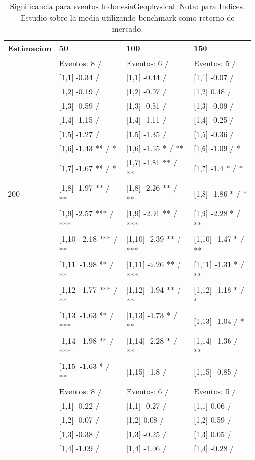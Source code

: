 \begin{table}

\caption{Significancia para eventos IndonesiaGeophysical. Nota: para Indices. Estudio sobre la media utilizando benchmark como retorno de mercado.}
\centering
\begin{tabular}[t]{llll}
\toprule
Estimacion & 50 & 100 & 150\\
\midrule
 & Eventos:  8 / & Eventos:  6 / & Eventos:  5 /\\
 & {}[1,1] -0.34  / & {}[1,1] -0.44  / & {}[1,1] -0.07  /\\
 & {}[1,2] -0.19  / & {}[1,2] -0.07  / & {}[1,2] 0.48  /\\
 & {}[1,3] -0.59  / & {}[1,3] -0.51  / & {}[1,3] -0.09  /\\
 & {}[1,4] -1.15  / & {}[1,4] -1.11  / & {}[1,4] -0.25  /\\
\addlinespace
 & {}[1,5] -1.27  / & {}[1,5] -1.35  / & {}[1,5] -0.36  /\\
 & {}[1,6] -1.43 ** / * & {}[1,6] -1.65 * / ** & {}[1,6] -1.09  / *\\
 & {}[1,7] -1.67 ** / * & {}[1,7] -1.81 ** / ** & {}[1,7] -1.4 * / *\\
200 & {}[1,8] -1.97 ** / ** & {}[1,8] -2.26 ** / ** & {}[1,8] -1.86 * / *\\
 & {}[1,9] -2.57 *** / *** & {}[1,9] -2.91 ** / *** & {}[1,9] -2.28 * / **\\
\addlinespace
 & {}[1,10] -2.18 *** / ** & {}[1,10] -2.39 ** / *** & {}[1,10] -1.47 * / **\\
 & {}[1,11] -1.98 ** / ** & {}[1,11] -2.26 ** / *** & {}[1,11] -1.31 * / **\\
 & {}[1,12] -1.77 *** / ** & {}[1,12] -1.94 ** / ** & {}[1,12] -1.18 * / *\\
 & {}[1,13] -1.63 ** / *** & {}[1,13] -1.73 * / ** & {}[1,13] -1.04  / *\\
 & {}[1,14] -1.98 ** / *** & {}[1,14] -2.28 * / ** & {}[1,14] -1.36  / **\\
\addlinespace
 & {}[1,15] -1.63 * / ** & {}[1,15] -1.8  / & {}[1,15] -0.85  /\\
 & Eventos:  8 / & Eventos:  6 / & Eventos:  5 /\\
 & {}[1,1] -0.22  / & {}[1,1] -0.27  / & {}[1,1] 0.06  /\\
 & {}[1,2] -0.07  / & {}[1,2] 0.08  / & {}[1,2] 0.59  /\\
 & {}[1,3] -0.38  / & {}[1,3] -0.25  / & {}[1,3] 0.05  /\\
\addlinespace
 & {}[1,4] -1.09  / & {}[1,4] -1.06  / & {}[1,4] -0.28  /\\

\end{tabular}
\end{table}

